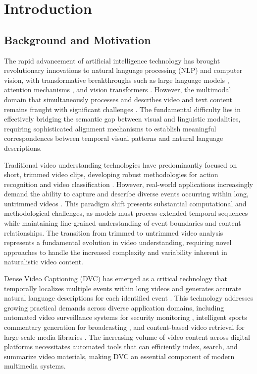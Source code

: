 
\chapter{Introduction}
\label{chap:introduction}

\section{Background and Motivation}


The rapid advancement of artificial intelligence technology has brought revolutionary innovations to natural language processing (NLP) and computer vision, with transformative breakthroughs such as large language models \cite{Brown2020-gx,Devlin2019-ld}, attention mechanisms \cite{Vaswani2017-sc}, and vision transformers \cite{Dosovitskiy2021-vn}.
However, the multimodal domain that simultaneously processes and describes video and text content remains fraught with significant challenges \cite{rahate2021multimodal,baltrusaitis2019multimodal}.
The fundamental difficulty lies in effectively bridging the semantic gap between visual and linguistic modalities, requiring sophisticated alignment mechanisms to establish meaningful correspondences between temporal visual patterns and natural language descriptions.

Traditional video understanding technologies have predominantly focused on short, trimmed video clips, developing robust methodologies for action recognition \cite{Carreira2017-fg,Feichtenhofer2019-mh} and video classification \cite{Karpathy2014-xm}.
However, real-world applications increasingly demand the ability to capture and describe diverse events occurring within long, untrimmed videos \cite{Heilbron2015-ha}.
This paradigm shift presents substantial computational and methodological challenges, as models must process extended temporal sequences while maintaining fine-grained understanding of event boundaries and content relationships.
The transition from trimmed to untrimmed video analysis represents a fundamental evolution in video understanding, requiring novel approaches to handle the increased complexity and variability inherent in naturalistic video content.

Dense Video Captioning (DVC) has emerged as a critical technology that temporally localizes multiple events within long videos and generates accurate natural language descriptions for each identified event \cite{Krishna2017-pw}.
This technology addresses growing practical demands across diverse application domains, including automated video surveillance systems for security monitoring \cite{stallings2019automated}, intelligent sports commentary generation for broadcasting \cite{chen2024integrated}, and content-based video retrieval for large-scale media libraries \cite{luo2020comprehensive}.
The increasing volume of video content across digital platforms necessitates automated tools that can efficiently index, search, and summarize video materials, making DVC an essential component of modern multimedia systems.

